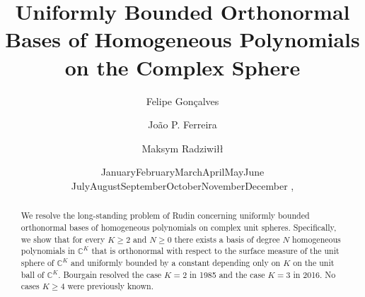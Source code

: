 \documentclass[a4paper,reqno,12pt]{amsart}
\def\today{\ifcase\month\or
  January\or February\or March\or April\or May\or June\or
  July\or August\or September\or October\or November\or December\fi
  \space\number\day, \number\year}
\theoremstyle{plain}
\theoremstyle{plain}
\theoremstyle{remark}
\theoremstyle{plain}
\theoremstyle{plain}
\theoremstyle{plain}
\begin{document}
\title[]{Uniformly Bounded Orthonormal Bases of Homogeneous Polynomials on the Complex Sphere}
\author{Felipe Gon\c{c}alves}
\address{IMPA - Instituto de Matemática Pura e Aplicada, Rio de Janeiro, 22460-320, Brazil.}

\author{João P. Ferreira}
\address{IMPA - Instituto de Matemática Pura e Aplicada, Rio de Janeiro, 22460-320, Brazil.}

\author{Maksym Radziwi\l{}\l{}}
\address{Courant Institute of Mathematical Sciences, New York University,
251 Mercer Street, New York, NY 10012, USA.}

\date{\today}
\allowdisplaybreaks

\begin{abstract}
We resolve the long-standing problem of Rudin concerning uniformly bounded orthonormal bases of homogeneous polynomials on complex unit spheres. Specifically, we show that for every $K \geq 2$ and $N \geq 0$ there exists a basis of degree $N$ homogeneous polynomials in $\mathbb{C}^K$ that is orthonormal with respect to the surface measure of the unit sphere of $\mathbb{C}^K$ and uniformly bounded by a constant depending only on $K$ on the unit ball of $\mathbb{C}^K$. Bourgain resolved the case $K = 2$ in 1985 and the case $K = 3$ in 2016. No cases $K \geq 4$ were previously known.
\end{abstract}

\maketitle

\end{document}

